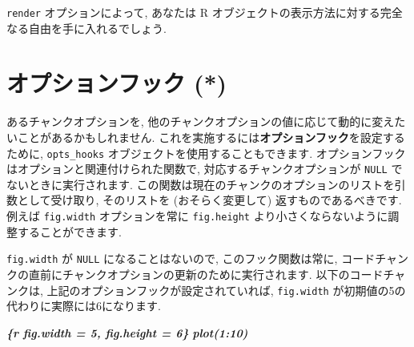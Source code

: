 \documentclass[
  11pt,
]{bxjsreport}
\newenvironment{Shaded}{\begin{snugshade}}{\end{snugshade}}
\newcommand{\AttributeTok}[1]{\textcolor[rgb]{0.77,0.63,0.00}{#1}}
\newcommand{\ControlFlowTok}[1]{\textcolor[rgb]{0.13,0.29,0.53}{\textbf{#1}}}
\newcommand{\FunctionTok}[1]{\textcolor[rgb]{0.00,0.00,0.00}{#1}}
\newcommand{\InformationTok}[1]{\textcolor[rgb]{0.56,0.35,0.01}{\textbf{\textit{#1}}}}
\newcommand{\NormalTok}[1]{#1}
\newcommand{\OtherTok}[1]{\textcolor[rgb]{0.56,0.35,0.01}{#1}}
\newcommand{\SpecialCharTok}[1]{\textcolor[rgb]{0.00,0.00,0.00}{#1}}
\begin{document}
\texttt{render} オプションによって, あなたは R オブジェクトの表示方法に対する完全なる自由を手に入れるでしょう.

\hypertarget{option-hooks}{%
\section{オプションフック (*)}\label{option-hooks}}

あるチャンクオプションを, 他のチャンクオプションの値に応じて動的に変えたいことがあるかもしれません. これを実施するには\textbf{オプションフック}を設定するために, \texttt{opts\_hooks} オブジェクトを使用することもできます. オプションフックはオプションと関連付けられた関数で, 対応するチャンクオプションが \texttt{NULL} でないときに実行されます. この関数は現在のチャンクのオプションのリストを引数として受け取り, そのリストを (おそらく変更して) 返すものであるべきです. 例えば \texttt{fig.width} オプションを常に \texttt{fig.height} より小さくならないように調整することができます.

\begin{Shaded}
\end{Shaded}

\texttt{fig.width} が \texttt{NULL} になることはないので, このフック関数は常に, コードチャンクの直前にチャンクオプションの更新のために実行されます. 以下のコードチャンクは, 上記のオプションフックが設定されていれば, \texttt{fig.width} が初期値の5の代わりに実際には6になります.

\begin{Shaded}
\begin{Highlighting}[]
\InformationTok{\textasciigrave{}\textasciigrave{}\textasciigrave{}\{r fig.width = 5, fig.height = 6\}}
\InformationTok{plot(1:10)}
\InformationTok{\textasciigrave{}\textasciigrave{}\textasciigrave{}}
\end{Highlighting}
\end{Shaded}
\end{document}
